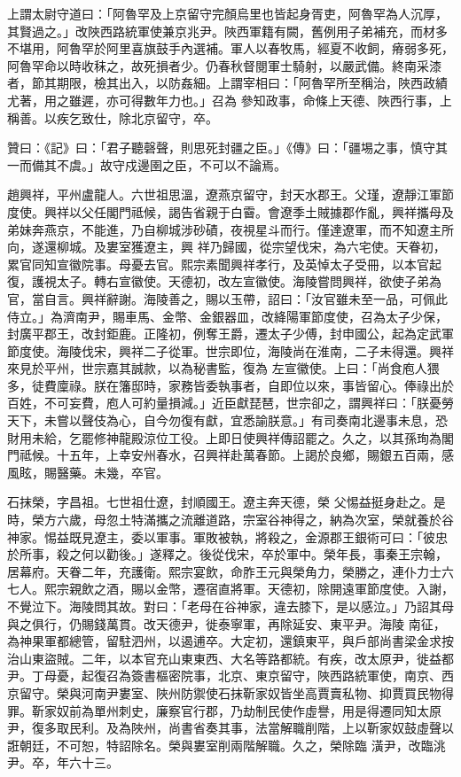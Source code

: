 \begin{pinyinscope}
 上謂太尉守道曰：「阿魯罕及上京留守完顏烏里也皆起身胥吏，阿魯罕為人沉厚，其賢過之。」改陜西路統軍使兼京兆尹。陜西軍籍有闕，舊例用子弟補充，而材多不堪用，阿魯罕於阿里喜旗鼓手內選補。軍人以春牧馬，經夏不收飼，瘠弱多死，阿魯罕命以時收秣之，故死損者少。仍春秋督閱軍士騎射，以嚴武備。終南采漆者，節其期限，檢其出入，以防姦細。上謂宰相曰：「阿魯罕所至稱治，陜西政績尤著，用之雖遲，亦可得數年力也。」召為
 參知政事，命條上天德、陜西行事，上稱善。以疾乞致仕，除北京留守，卒。



 贊曰：《記》曰：「君子聽磬聲，則思死封疆之臣。」《傳》曰：「疆埸之事，慎守其一而備其不虞。」故守戍邊圉之臣，不可以不論焉。



 趙興祥，平州盧龍人。六世祖思溫，遼燕京留守，封天水郡王。父瑾，遼靜江軍節度使。興祥以父任閣門祗候，謁告省親于白霫。會遼季土賊據郡作亂，興祥攜母及弟妹奔燕京，不能進，乃自柳城涉砂磧，夜視星斗而行。僅達遼軍，而不知遼主所向，遂還柳城。及婁室獲遼主，興
 祥乃歸國，從宗望伐宋，為六宅使。天眷初，累官同知宣徽院事。母憂去官。熙宗素聞興祥孝行，及英悼太子受冊，以本官起復，護視太子。轉右宣徽使。天德初，改左宣徽使。海陵嘗問興祥，欲使子弟為官，當自言。興祥辭謝。海陵善之，賜以玉帶，詔曰：「汝官雖未至一品，可佩此侍立。」為濟南尹，賜車馬、金幣、金銀器皿，改絳陽軍節度使，召為太子少保，封廣平郡王，改封鉅鹿。正隆初，例奪王爵，遷太子少傅，封申國公，起為定武軍節度使。海陵伐宋，興祥二子從軍。世宗即位，海陵尚在淮南，二子未得還。興祥來見於平州，世宗嘉其誠款，以為秘書監，復為
 左宣徽使。上曰：「尚食庖人猥多，徒費廩祿。朕在籓邸時，家務皆委執事者，自即位以來，事皆留心。俸祿出於百姓，不可妄費，庖人可約量損減。」近臣獻琵琶，世宗卻之，謂興祥曰：「朕憂勞天下，未嘗以聲伎為心，自今勿復有獻，宜悉諭朕意。」有司奏南北邊事未息，恐財用未給，乞罷修神龍殿涼位工役。上即日使興祥傳詔罷之。久之，以其孫珣為閣門祗候。十五年，上幸安州春水，召興祥赴萬春節。上謁於良鄉，賜銀五百兩，感風眩，賜醫藥。未幾，卒官。



 石抹榮，字昌祖。七世祖仕遼，封順國王。遼主奔天德，榮
 父惕益挺身赴之。是時，榮方六歲，母忽土特滿攜之流離道路，宗室谷神得之，納為次室，榮就養於谷神家。惕益既見遼主，委以軍事。軍敗被執，將殺之，金源郡王銀術可曰：「彼忠於所事，殺之何以勸後。」遂釋之。後從伐宋，卒於軍中。榮年長，事秦王宗翰，居幕府。天眷二年，充護衛。熙宗宴飲，命胙王元與榮角力，榮勝之，連仆力士六七人。熙宗親飲之酒，賜以金幣，遷宿直將軍。天德初，除開遠軍節度使。入謝，不覺泣下。海陵問其故。對曰：「老母在谷神家，違去膝下，是以感泣。」乃詔其母與之俱行，仍賜錢萬貫。改天德尹，徙泰寧軍，再除延安、東平尹。海陵
 南征，為神果軍都總管，留駐泗州，以遏逋卒。大定初，還鎮東平，與戶部尚書梁金求按治山東盜賊。二年，以本官充山東東西、大名等路都統。有疾，改太原尹，徙益都尹。丁母憂，起復召為簽書樞密院事，北京、東京留守，陜西路統軍使，南京、西京留守。榮與河南尹婁室、陜州防禦使石抹靳家奴皆坐高賈賣私物、抑賈買民物得罪。靳家奴前為單州刺史，廉察官行郡，乃劫制民使作虛譽，用是得遷同知太原尹，復多取民利。及為陜州，尚書省奏其事，法當解職削階，上以靳家奴鼓虛聲以誑朝廷，不可恕，特詔除名。榮與婁室削兩階解職。久之，榮除臨
 潢尹，改臨洮尹。卒，年六十三。




\end{pinyinscope}
